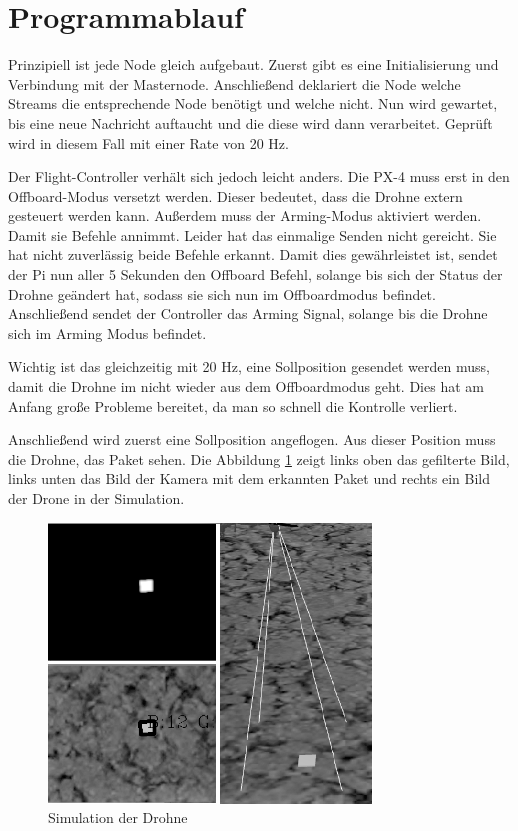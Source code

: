 \section{Programmablauf}
Prinzipiell ist jede Node gleich aufgebaut. Zuerst gibt es eine Initialisierung und Verbindung mit der Masternode. Anschließend deklariert die Node welche Streams die entsprechende Node benötigt und welche nicht. Nun wird gewartet, bis eine neue Nachricht auftaucht und die diese wird dann verarbeitet. Geprüft wird in diesem Fall mit einer Rate von 20 Hz. 

Der Flight-Controller verhält sich jedoch leicht anders. Die PX-4 muss erst in den Offboard-Modus versetzt werden. Dieser bedeutet, dass die Drohne extern gesteuert werden kann. Außerdem muss der Arming-Modus aktiviert werden. Damit sie Befehle annimmt. Leider hat das einmalige Senden nicht gereicht. Sie hat nicht zuverlässig beide Befehle erkannt. Damit dies gewährleistet ist, sendet der Pi nun aller 5 Sekunden den Offboard Befehl, solange bis sich der Status der Drohne geändert hat, sodass sie sich nun im Offboardmodus befindet. Anschließend sendet der Controller das Arming Signal, solange bis die Drohne sich im Arming Modus befindet.

Wichtig ist das gleichzeitig mit 20 Hz, eine Sollposition gesendet werden muss, damit die Drohne im nicht wieder aus dem Offboardmodus geht. Dies hat am Anfang große Probleme bereitet, da man so schnell die Kontrolle verliert.

Anschließend wird zuerst eine Sollposition angeflogen. Aus dieser Position muss die Drohne, das Paket sehen. Die Abbildung \ref{fig:Drone_Simulation1} zeigt links oben das gefilterte Bild, links unten das Bild der Kamera mit dem erkannten Paket und rechts ein Bild der Drone in der Simulation. 
\begin{figure}[h]
	\centering
	\includegraphics[scale=1.2]{"Grafiken/Drone_Gazebossimulatiuon1.png"}
	\caption{Simulation der Drohne}
	\label{fig:Drone_Simulation1}
\end{figure}

